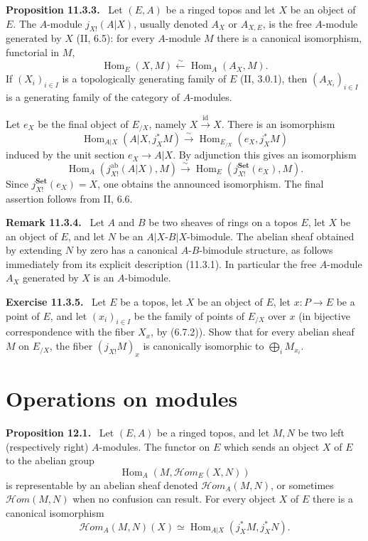 \documentclass[11pt]{article}
\newcommand{\Set}{\mathbf{Set}}
\newcommand{\Hom}{\operatorname{Hom}}
\newcommand{\id}{\operatorname{id}}
\newcommand{\scrHom}{\mathscr{H}\!om}
\newcommand{\ab}{\mathrm{ab}}
\newenvironment{statement}[1]{\par\medskip\noindent\textbf{#1.}\ }{\par\medskip}
\newenvironment{remarktext}[1]{\par\medskip\noindent\textbf{#1.}\ }{\par\medskip}
\begin{document}
\begin{statement}{Proposition 11.3.3}
Let $(E,A)$ be a ringed topos and let $X$ be an object of $E$. The $A$-module $j_{X!}(A|X)$, usually denoted $A_X$ or $A_{X,E}$, is the free $A$-module generated by $X$ (II, 6.5): for every $A$-module $M$ there is a canonical isomorphism, functorial in $M$,
\[
\Hom_E(X,M)\xleftarrow{\sim}\Hom_A(A_X,M).
\]
If $(X_i)_{i\in I}$ is a topologically generating family of $E$ (II, 3.0.1), then $(A_{X_i})_{i\in I}$ is a generating family of the category of $A$-modules.
\end{statement}

Let $e_X$ be the final object of $E_{/X}$, namely $X\xrightarrow{\id}X$. There is an isomorphism
\[
\Hom_{A|X}(A|X,j_X^*M)\xrightarrow{\sim}\Hom_{E_{/X}}(e_X,j_X^*M)
\]
induced by the unit section $e_X\to A|X$. By adjunction this gives an isomorphism
\[
\Hom_A(j^{\ab}_{X!}(A|X),M)\xrightarrow{\sim}\Hom_E(j^{\Set}_{X!}(e_X),M).
\]
Since $j^{\Set}_{X!}(e_X)=X$, one obtains the announced isomorphism. The final assertion follows from II, 6.6.

\begin{remarktext}{Remark 11.3.4}
Let $A$ and $B$ be two sheaves of rings on a topos $E$, let $X$ be an object of $E$, and let $N$ be an $A|X$-$B|X$-bimodule. The abelian sheaf obtained by extending $N$ by zero has a canonical $A$-$B$-bimodule structure, as follows immediately from its explicit description (11.3.1). In particular the free $A$-module $A_X$ generated by $X$ is an $A$-bimodule.
\end{remarktext}

\begin{remarktext}{Exercise 11.3.5}
Let $E$ be a topos, let $X$ be an object of $E$, let $x:P\to E$ be a point of $E$, and let $(x_i)_{i\in I}$ be the family of points of $E_{/X}$ over $x$ (in bijective correspondence with the fiber $X_x$, by (6.7.2)). Show that for every abelian sheaf $M$ on $E_{/X}$, the fiber $(j_{X!}M)_x$ is canonically isomorphic to $\bigoplus_i M_{x_i}$.
\end{remarktext}

\section{Operations on modules}

\begin{statement}{Proposition 12.1}
Let $(E,A)$ be a ringed topos, and let $M,N$ be two left (respectively right) $A$-modules. The functor on $E$ which sends an object $X$ of $E$ to the abelian group
\[
\Hom_A(M,\scrHom_E(X,N))
\]
is representable by an abelian sheaf denoted $\scrHom_A(M,N)$, or sometimes $\scrHom(M,N)$ when no confusion can result. For every object $X$ of $E$ there is a canonical isomorphism
\begin{equation}
\scrHom_A(M,N)(X)\simeq \Hom_{A|X}(j_X^*M,j_X^*N).\tag{12.1.1}
\end{equation}
\end{statement}
\end{document}
